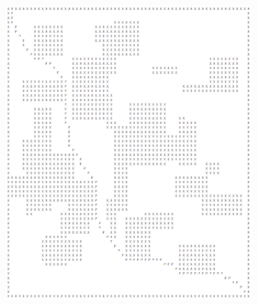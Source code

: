 \documentclass{article}
\begin{document}
\begin{figure}[h]
\begin{subfigure}[b]{0.49\textwidth}
    \end{subfigure}
    \begin{subfigure}[b]{0.49\textwidth}
        \centering
        \includegraphics[width=\textwidth]{figures/map_3.png}
    \end{subfigure}
    \begin{subfigure}[b]{0.49\textwidth}
        \centering

\end{subfigure}
\end{figure}
\end{document}

